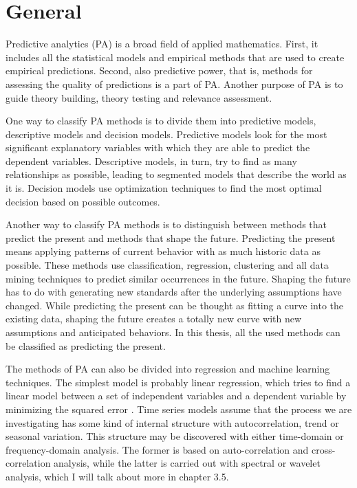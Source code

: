 \section{General}
Predictive analytics (PA) is a broad field of applied mathematics. First, it includes all the statistical models and empirical methods that are used to create empirical predictions. Second, also predictive power, that is, methods for assessing the quality of predictions is a part of PA. \cite{Shmueli10} Another purpose of PA is to guide theory building, theory testing and relevance assessment. \cite{Dubin69}

One way to classify PA methods is to divide them into predictive models, descriptive models and decision models. Predictive models look for the most significant explanatory variables with which they are able to predict the dependent variables. Descriptive models, in turn, try to find as many relationships as possible, leading to segmented models that describe the world as it is. Decision models use optimization techniques to find the most optimal decision based on possible outcomes. \cite{Fico06}

Another way to classify PA methods is to distinguish between methods that predict the present and methods that shape the future. Predicting the present means applying patterns of current behavior with as much historic data as possible. These methods use classification, regression, clustering and all data mining techniques to predict similar occurrences in the future. Shaping the future has to do with generating new standards after the underlying assumptions have changed. While predicting the present can be thought as fitting a curve into the existing data, shaping the future creates a totally new curve with new assumptions and anticipated behaviors. \cite{Oracle10} In this thesis, all the used methods can be classified as predicting the present.

The methods of PA can also be divided into regression and machine learning  techniques. The simplest model is probably linear regression, which tries to find a linear model between a set of independent variables and a dependent variable by minimizing the squared error \cite{Montgomery12}. Time series models assume that the process we are investigating has some kind of internal structure with autocorrelation, trend or seasonal variation. This structure may be discovered with either time-domain or frequency-domain analysis. \cite{Hamilton94} The former is based on auto-correlation and cross-correlation analysis, while the latter is carried out with spectral or wavelet analysis, which I will talk about more in chapter 3.5.

